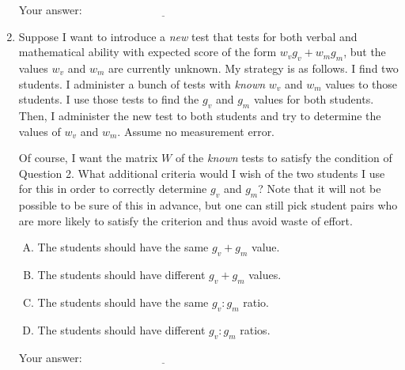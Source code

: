 \documentclass[10pt]{amsart}
\begin{document}
\begin{enumerate}
  \vspace{0.1in}
  Your answer: $\underline{\qquad\qquad\qquad\qquad\qquad\qquad\qquad}$
  \vspace{0.1in}

\item Suppose I want to introduce a {\em new} test that tests for both
  verbal and mathematical ability with expected score of the form
  $w_vg_v + w_mg_m$, but the values $w_v$ and $w_m$ are currently
  unknown. My strategy is as follows. I find two students. I
  administer a bunch of tests with {\em known} $w_v$ and $w_m$ values
  to those students. I use those tests to find the $g_v$ and $g_m$
  values for both students. Then, I administer the new test to both
  students and try to determine the values of $w_v$ and $w_m$. Assume
  no measurement error.

  Of course, I want the matrix $W$ of the {\em known} tests to satisfy
  the condition of Question 2. What additional criteria would I wish
  of the two students I use for this in order to correctly determine
  $g_v$ and $g_m$? Note that it will not be possible to be sure of
  this in advance, but one can still pick student pairs who are more
  likely to satisfy the criterion and thus avoid waste of effort.

  \begin{enumerate}[(A)]
  \item The students should have the same $g_v + g_m$ value.
  \item The students should have different $g_v + g_m$ values.
  \item The students should have the same $g_v:g_m$ ratio.
  \item The students should have different $g_v:g_m$ ratios.
  \end{enumerate}

  \vspace{0.1in}
  Your answer: $\underline{\qquad\qquad\qquad\qquad\qquad\qquad\qquad}$
  \vspace{0.1in}

\end{enumerate}
\end{document}
